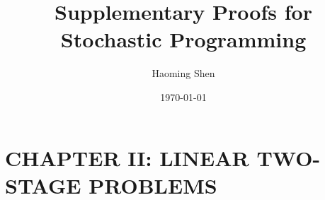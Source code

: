 \documentclass[11pt]{article}
\author{Haoming Shen}
\date{\today}
\title{Supplementary Proofs for Stochastic Programming}
\begin{document}
\maketitle
\tableofcontents

\clearpage

\section{CHAPTER II: LINEAR TWO-STAGE PROBLEMS}
\label{sec-1}
\end{document}
